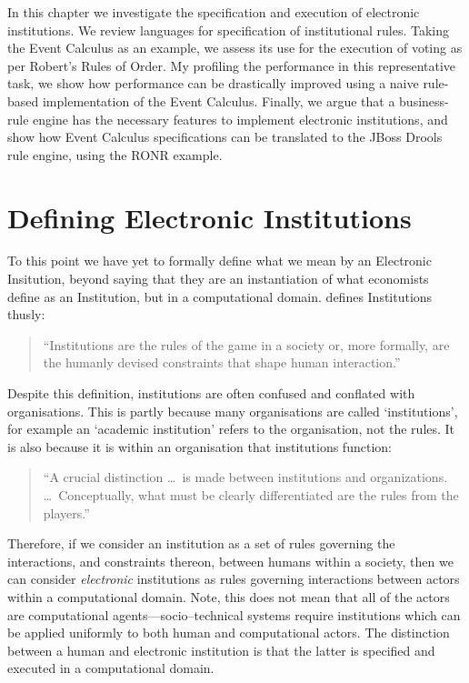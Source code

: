 In this chapter we investigate the specification and execution of electronic
institutions. We review languages for specification of institutional rules.
Taking the Event Calculus as an example, we assess its use for the execution of
voting as per Robert's Rules of Order. My profiling the performance in this representative task, we show how performance can be drastically
improved using a naive rule-based implementation of the Event Calculus. Finally,
we argue that a business-rule engine has the necessary features to implement
electronic institutions, and show how Event Calculus specifications can be
translated to the JBoss Drools rule engine, using the \ac{RONR} example. 


\section{Defining Electronic Institutions}\label{sec:instdefn}

To this point we have yet to formally define what we mean by an Electronic
Insitution, beyond saying that they are an instantiation of what economists
define as an Institution, but in a computational domain. \citet{North1990}
defines Institutions thusly: 

\begin{quote}
``Institutions are the rules of the
game in a society or, more formally, are the humanly devised constraints that
shape human interaction.''~\citep[p.3]{North1990}
\end{quote}

Despite this definition, institutions are often confused and conflated with
organisations. This is partly because many organisations are called
`institutions', for example an `academic institution' refers to the
organisation, not the rules. It is also because it is within an organisation
that institutions function:

\begin{quote}
``A crucial distinction \ldots\ is made between institutions and organizations.
\ldots\ Conceptually, what must be clearly differentiated are the rules from the
players.''~\citep[p.4]{North1990}
\end{quote}

Therefore, if we consider an institution as a set of rules governing the
interactions, and constraints thereon, between humans within a society, then
we can consider \emph{electronic} institutions as rules governing interactions
between actors within a computational domain. Note, this does not mean that all
of the actors are computational agents---socio--technical systems require
institutions which can be applied uniformly to both human and computational
actors. The distinction between a human and electronic institution is that the
latter is specified and executed in a computational domain.

